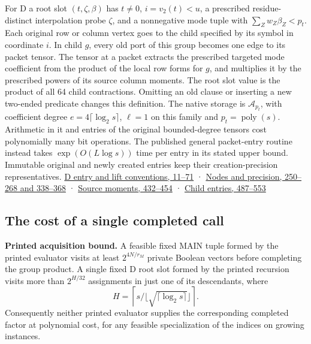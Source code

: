\documentclass[
  11pt,
]{article}
\begin{document}
For D a root slot \((t,\zeta,\beta)\) has \(t\ne0\), \(i=v_2(t)<u\), a
prescribed residue-distinct interpolation probe \(\zeta\), and a
nonnegative mode tuple with \(\sum_Z w_Z\beta_Z<p_t\). Each original row
or column vertex goes to the child specified by its symbol in coordinate
\(i\). In child \(g\), every old port of this group becomes one edge to
its packet tensor. The tensor at a packet extracts the prescribed
targeted mode coefficient from the product of the local row forms for
\(g\), and multiplies it by the prescribed powers of its source column
moments. The root slot value is the product of all 64 child
contractions. Omitting an old clause or inserting a new two-ended
predicate changes this definition. The native storage is
\(\mathcal A_{p_t}\), with coefficient degree
\(e=4\lceil\log_2s\rceil\), \(\ell=1\) on this family and
\(p_t=\operatorname{poly}(s)\). Arithmetic in it and entries of the
original bounded-degree tensors cost polynomially many bit operations.
The published general packet-entry routine instead takes
\(\exp(O(L\log s))\) time per entry in its stated upper bound. Immutable
original and newly created entries keep their creation-precision
representatives.
\href{https://github.com/openai/math/blob/main/preprints/The-Exponential-Time-Hypothesis-is-False-October-25-2026/build/quantitative-contraction.tex\#L11}{D
entry and lift conventions, 11--71} ·
\href{https://github.com/openai/math/blob/main/preprints/The-Exponential-Time-Hypothesis-is-False-October-25-2026/build/quantitative-contraction.tex\#L250}{Nodes
and precision, 250--268 and 338--368} ·
\href{https://github.com/openai/math/blob/main/preprints/The-Exponential-Time-Hypothesis-is-False-October-25-2026/build/quantitative-contraction.tex\#L432}{Source
moments, 432--454} ·
\href{https://github.com/openai/math/blob/main/preprints/The-Exponential-Time-Hypothesis-is-False-October-25-2026/build/quantitative-contraction.tex\#L487}{Child
entries, 487--553}

\subsection{The cost of a single completed
call}\label{v8-the-cost-of-a-single-completed-call}

\textbf{Printed acquisition bound.} A feasible fixed MAIN tuple formed
by the printed evaluator visits at least \(2^{4N/r_M}\) private Boolean
vectors before completing the group product. A single fixed D root slot
formed by the printed recursion visits more than \(2^{H/32}\)
assignments in just one of its descendants, where \[
 H=\left\lceil s/\lfloor\sqrt{\lceil\log_2s\rceil}\rfloor\right\rceil.
\] Consequently neither printed evaluator supplies the corresponding
completed factor at polynomial cost, for any feasible specialization of
the indices on growing instances.
\end{document}
